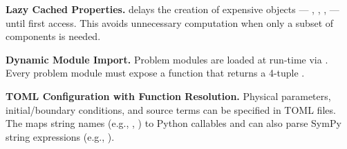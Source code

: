 \begin{designbox}
\textbf{Lazy Cached Properties.}   delays the creation of expensive objects --- , , ,  --- until first access.  This avoids unnecessary computation when only a subset of components is needed.
\end{designbox}

\begin{designbox}
\textbf{Dynamic Module Import.}  Problem modules are loaded at run-time via .  Every problem module must expose a function  that returns a 4-tuple .
\end{designbox}

\begin{designbox}
\textbf{TOML Configuration with Function Resolution.}  Physical parameters, initial/boundary conditions, and source terms can be specified in TOML files.  The  maps string names (e.g., , ) to Python callables and can also parse SymPy string expressions (e.g., ).
\end{designbox}
